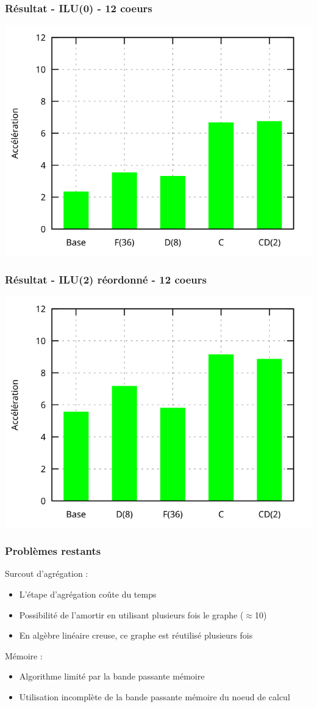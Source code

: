\documentclass{beamer}
\begin{document}
\begin{frame}
  \frametitle{Résultat - ILU(0) - 12 coeurs}
  \centerline{\includegraphics[width=0.8\linewidth]{res_ilu0}}
\end{frame}


\begin{frame}
  \frametitle{Résultat - ILU(2) réordonné - 12 coeurs}
  \centerline{\includegraphics[width=0.8\linewidth]{res_iluk}}
\end{frame}


\begin{frame}
  \frametitle{Problèmes restants}

  Surcout d'agrégation :
  \begin{itemize}
    \item L'étape d'agrégation coûte du temps
    \item Possibilité de l'amortir en utilisant plusieurs fois le graphe ($\approx$10)
    \item En algèbre linéaire creuse, ce graphe est réutilisé plusieurs fois
  \end{itemize}

  Mémoire :
  \begin{itemize}
    \item Algorithme limité par la bande passante mémoire
    \item Utilisation incomplète de la bande passante mémoire du noeud de calcul
  \end{itemize}
\end{frame}
\end{document}
